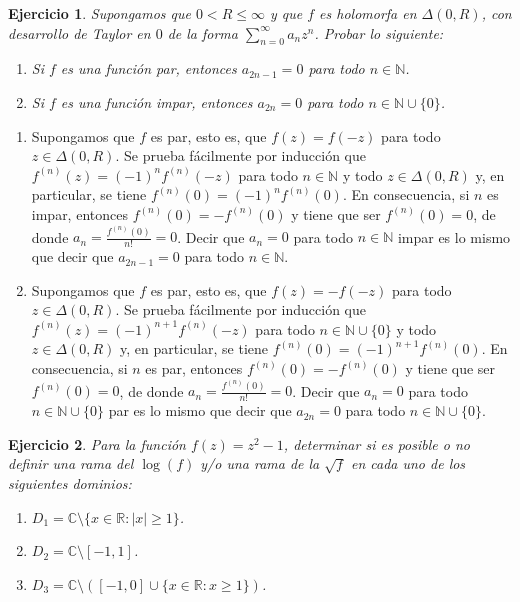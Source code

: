 \documentclass[11pt]{report}
\makeatletter
\renewenvironment{proof}[1][\proofname]{\par
  \pushQED{\qed}%
  \normalfont \topsep\z@skip %
  \trivlist
  \item[\hskip\labelsep
        \itshape
    #1\@addpunct{.}]\ignorespaces
}{%
  \popQED\endtrivlist\@endpefalse
}
\newcommand{\N}{\mathbb N}
\newcommand{\R}{\mathbb R}
\newcommand{\C}{\mathbb C}
\newtheorem{ejercicio}{Ejercicio}
\makeatother
\begin{document}
\begin{ejercicio}
  Supongamos que $0 < R \leq \infty$ y que $f$ es holomorfa en $\Delta(0,R)$, con desarrollo de Taylor en $0$ de la forma $\sum_{n=0}^\infty a_nz^n$. Probar lo siguiente:
  \begin{enumerate}
    \item Si $f$ es una función par, entonces $a_{2n-1} = 0$ para todo $n \in \N$.
    \item Si $f$ es una función impar, entonces $a_{2n} = 0$ para todo $n \in \N \cup \{0\}$. 
  \end{enumerate}
\end{ejercicio}

\begin{proof}
  \hfill
  \begin{enumerate}
    \item Supongamos que $f$ es par, esto es, que $f(z) = f(-z)$ para todo $z \in \Delta(0,R)$. Se prueba fácilmente por inducción que $f^{(n)}(z) = (-1)^n f^{(n)}(-z)$ para todo $n \in \N$ y todo $z \in \Delta(0,R)$ y, en particular, se tiene $f^{(n)}(0)=(-1)^nf^{(n)}(0)$. En consecuencia, si $n$ es impar, entonces $f^{(n)}(0) = -f^{(n)}(0)$ y tiene que ser $f^{(n)}(0) = 0$, de donde $a_n = \frac{f^{(n)}(0)}{n!}=0$. Decir que $a_n=0$ para todo $n \in \N$ impar es lo mismo que decir que $a_{2n-1} = 0$ para todo $n \in \N$.
    \item Supongamos que $f$ es par, esto es, que $f(z) = -f(-z)$ para todo $z \in \Delta(0,R)$. Se prueba fácilmente por inducción que $f^{(n)}(z) = (-1)^{n+1} f^{(n)}(-z)$ para todo $n \in \N \cup \{0\}$ y todo $z \in \Delta(0,R)$ y, en particular, se tiene $f^{(n)}(0)=(-1)^{n+1}f^{(n)}(0)$. En consecuencia, si $n$ es par, entonces $f^{(n)}(0) = -f^{(n)}(0)$ y tiene que ser $f^{(n)}(0) = 0$, de donde $a_n = \frac{f^{(n)}(0)}{n!}=0$. Decir que $a_n=0$ para todo $n \in \N \cup \{0\}$ par es lo mismo que decir que $a_{2n} = 0$ para todo $n \in \N \cup \{0\}$. \qedhere
  \end{enumerate}
\end{proof}

\begin{ejercicio}
  Para la función $f(z)=z^2-1$, determinar si es posible o no definir una rama del $\log(f)$ y/o una rama de la $\sqrt{f}$ en cada uno de los siguientes dominios:
    \begin{enumerate}
      \item $D_1 = \C \setminus \{x \in \R \colon |x| \geq 1\}$.
      \item $D_2 = \C \setminus [-1,1]$.
      \item $D_3 = \C \setminus ([-1,0] \cup \{x \in \R \colon x \geq 1\})$.
    \end{enumerate}
\end{ejercicio}
\end{document}
